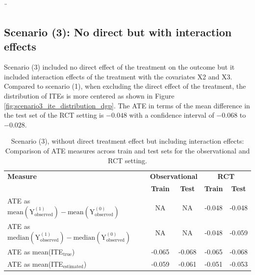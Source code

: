 \clearpage 
¨
\subsection{Scenario (3): No direct but with interaction effects}

Scenario (3) included no direct effect of the treatment on the outcome but it included interaction effects of the treatment with the covariates X2 and X3. Compared to scenario (1), when excluding the direct effect of the treatment, the distribution of ITEs is more centered as shown in Figure \ref{fig:scenario3_ite_distribution_dgp}. The ATE in terms of the mean difference in the test set of the RCT setting is $-0.048$ with a confidence interval of $-0.068$ to $-0.028$. 



\begin{table}[htbp]
\centering
\small
\caption{Scenario (3), without direct treatment effect but including interaction effects: Comparison of ATE measures across train and test sets for the observational and RCT setting.}
\label{tab:scenario3_ate_comparison}
\begin{tabular}{l c c c c}
\toprule
\textbf{Measure} & \multicolumn{2}{c}{\textbf{Observational}} & \multicolumn{2}{c}{\textbf{RCT}} \\
\cmidrule(lr){2-3} \cmidrule(lr){4-5}
 & \textbf{Train} & \textbf{Test} & \textbf{Train} & \textbf{Test} \\
\midrule
ATE as $\text{mean}(\text{Y}_\text{observed}^{(1)}) - \text{mean}(\text{Y}_\text{observed}^{(0)})$ & NA & NA & -0.048 & -0.048 \\
ATE as $\text{median}(\text{Y}_\text{observed}^{(1)}) - \text{median}(\text{Y}_\text{observed}^{(0)})$ & NA & NA & -0.048 & -0.059 \\
ATE as mean(ITE$_\text{true}$)  & -0.065 & -0.068 & -0.065 & -0.068 \\
ATE as mean(ITE$_\text{estimated}$) & -0.059 & -0.061 & -0.051 & -0.053 \\
\bottomrule
\end{tabular}
\end{table}



